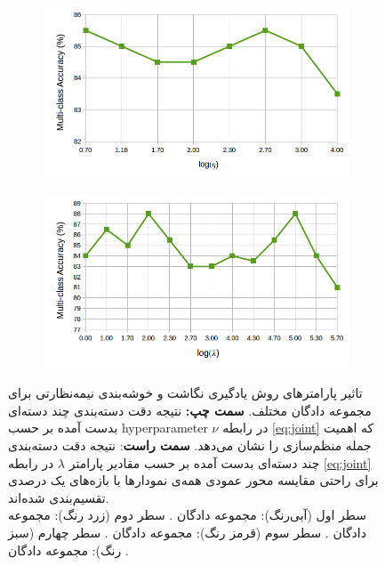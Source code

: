 \begin{figure}[!h]
\begin{subfigure}[b]{0.43\linewidth}
  \end{subfigure}
    \begin{subfigure}[b]{0.43\linewidth}
    \includegraphics[width=\linewidth]{images/jeac_gamma_sun.png}
  \end{subfigure}
  \begin{subfigure}[b]{0.43\linewidth}
    \includegraphics[width=\linewidth]{images/jeac_lambda_sun}
  \end{subfigure}
  \caption[تحلیل پارامترهای روش یادگیری نگاشت و خوشه‌بندی توام]{
  تاثیر پارامترهای  روش یادگیری نگاشت و خوشه‌بندی نیمه‌نظارتی برای مجموعه دادگان مختلف.
\textbf{سمت چپ:}
   نتیجه دقت دسته‌بندی چند دسته‌ای بدست آمده بر حسب \gls{hyperparameter}  $\nu$ در رابطه
\eqref{eq:joint}
 که اهمیت جمله منظم‌سازی را نشان می‌دهد.
 \textbf{سمت راست}:
 نتیجه دقت  دسته‌بندی چند دسته‌ای بدست آمده بر حسب مقادیر پارامتر $\lambda$ در رابطه \eqref{eq:joint}
برای راحتی مقایسه محور عمودی  همه‌ی نمودارها با بازه‌های یک درصدی تقسیم‌بندی شده‌اند.\\
سطر اول (آبی‌رنگ): مجموعه دادگان . سطر دوم (زرد رنگ): مجموعه دادگان . سطر سوم (قرمز رنگ): مجموعه دادگان . سطر چهارم (سبز رنگ): مجموعه دادگان .
 }
  \label{fig:jeac_params}
  \end{figure}

